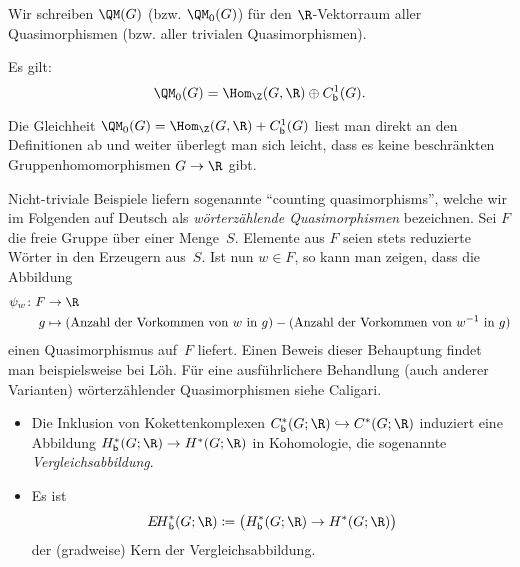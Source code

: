 \begin{thDef}
    Wir schreiben $\QM(G)$ (bzw. $\QM_0(G)$) für den $\R$-Vektorraum aller
    Quasimorphismen (bzw. aller trivialen Quasimorphismen). 
\end{thDef}

\begin{thProposition}
    Es gilt:
    \[ \QM_0(G) = \Hom_\Z(G,\R) \oplus \Cb^1(G)  . \]
\end{thProposition}

\begin{proofsketch}
    Die Gleichheit $\QM_0(G) = \Hom_\Z(G,\R) + \Cb^1(G)$ liest man direkt an den
    Definitionen ab und weiter überlegt man sich leicht, dass es keine beschränkten
    Gruppenhomomorphismen $G\to\R$ gibt.
    \\
\end{proofsketch}

\begin{thBeispiel}
    Nicht-triviale Beispiele liefern sogenannte \enquote{counting
    quasimorphisms}, welche wir im Folgenden auf Deutsch als
    \emph{wörterzählende Quasimorphismen} bezeichnen. Sei $F$ die freie Gruppe
    über einer Menge~$S$. Elemente aus $F$ seien stets reduzierte Wörter in den
    Erzeugern aus~$S$. Ist nun $w\in F$, so kann man zeigen, dass die Abbildung
    \begin{align*}
        \psi_w\colon F &\to \R  \\
        g &\mapsto (\text{Anzahl der Vorkommen von $w$ in $g$})
                 - (\text{Anzahl der Vorkommen von $w^{-1}$ in $g$})
    \end{align*}
    einen Quasimorphismus auf~$F$ liefert. Einen Beweis dieser Behauptung findet
    man beispielsweise bei
    Löh\cite[Ch.\,2,.3,\;Lemma~2.5.11]{lecnotes:loeh:bdcoho}.
    Für eine ausführlichere Behandlung (auch anderer Varianten) wörterzählender
    Quasimorphismen siehe Caligari\cite[Ch.\,2,.2]{bookc:calegari09}.
\end{thBeispiel}

\begin{thErinnerDef} \hfill
    \begin{itemize}
        \item
            Die Inklusion von Kokettenkomplexen $\Cb^\ast(G;\R) \hookrightarrow
            C^\ast(G;\R)$ induziert eine Abbildung $\Hb^\ast(G;\R) \to
            H^\ast(G;\R)$ in Kohomologie, die sogenannte
            \emph{Vergleichsabbildung}.
        \item
            Es ist
            \[ \EHb^\ast(G;\R)
                \defeq \ker\bigl( \Hb^\ast(G;\R) \to H^\ast(G;\R) \bigr)
            \]
            der (gradweise) Kern der Vergleichsabbildung.
    \end{itemize}
\end{thErinnerDef}

